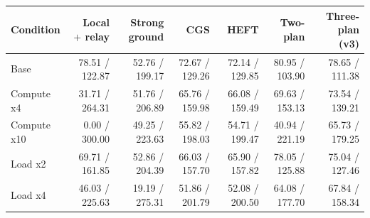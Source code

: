\begin{tabular}{lrrrrrr}
\hline
Condition & Local $+$ relay & Strong ground & CGS & HEFT & Two-plan & Three-plan (v3) \\
\hline
Base & 78.51 / 122.87 & 52.76 / 199.17 & 72.67 / 129.26 & 72.14 / 129.85 & 80.95 / 103.90 & 78.65 / 111.38 \\
Compute x4 & 31.71 / 264.31 & 51.76 / 206.89 & 65.76 / 159.98 & 66.08 / 159.49 & 69.63 / 153.13 & 73.54 / 139.21 \\
Compute x10 & 0.00 / 300.00 & 49.25 / 223.63 & 55.82 / 198.03 & 54.71 / 199.47 & 40.94 / 221.19 & 65.73 / 179.25 \\
Load x2 & 69.71 / 161.85 & 52.86 / 204.39 & 66.03 / 157.70 & 65.90 / 157.82 & 78.05 / 125.88 & 75.04 / 127.46 \\
Load x4 & 46.03 / 225.63 & 19.19 / 275.31 & 51.86 / 201.79 & 52.08 / 200.50 & 64.08 / 177.70 & 67.84 / 158.34 \\
\hline
\end{tabular}
